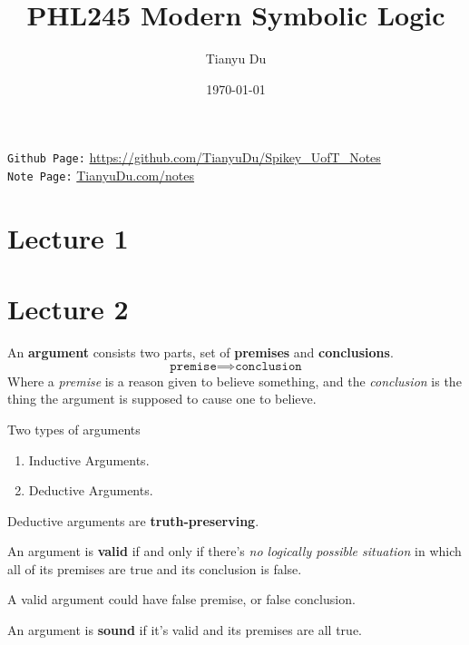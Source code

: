 \documentclass[11pt]{article}
\title{PHL245 Modern Symbolic Logic}
\author{Tianyu Du}
\date{\today}
\begin{document}
	\maketitle
	\doclicenseThis
	\texttt{Github Page:} \url{https://github.com/TianyuDu/Spikey_UofT_Notes}\\
	\texttt{Note Page:} \url{TianyuDu.com/notes}
	\section{Lecture 1}
	\section{Lecture 2}
		\begin{definition}
			An \textbf{argument} consists two parts, set of \textbf{premises} and \textbf{conclusions}.
			\begin{equation}
				\texttt{premise} \implies \texttt{conclusion}
			\end{equation}
			Where a \emph{premise} is a reason given to believe something, and the \emph{conclusion} is the thing the argument is supposed to cause one to believe.
		\end{definition}
		
		\begin{remark} Two types of arguments
			\begin{enumerate}
				\item Inductive Arguments.
				\item Deductive Arguments.
			\end{enumerate}
		\end{remark}
		
		\begin{remark}
			Deductive arguments are \textbf{truth-preserving}.
		\end{remark}
		
		\begin{definition}
			An argument is \textbf{valid} if and only if there's \emph{no logically possible situation} in which all of its premises are true and its conclusion is false.
		\end{definition}
		
		\begin{remark}[Vacuous]
			A valid argument could have false premise, or false conclusion.
		\end{remark}
		
		\begin{definition}
			An argument is \textbf{sound} if it's valid and its premises are all true.
		\end{definition}
		
\end{document}
